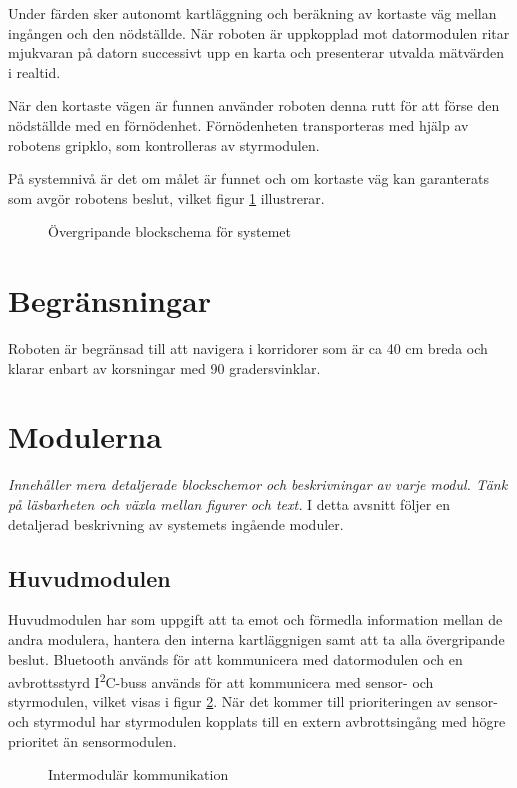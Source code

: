 \documentclass[11pt]{article}
\begin{document}
\begin{flushleft}
Under färden sker autonomt kartläggning och beräkning av kortaste väg mellan ingången och den nödställde. När roboten är uppkopplad mot datormodulen ritar mjukvaran på datorn successivt upp en karta och presenterar utvalda mätvärden i realtid. 

När den kortaste vägen är funnen använder roboten denna rutt för att förse den nödställde med en förnödenhet. Förnödenheten transporteras med hjälp av robotens gripklo, som kontrolleras av styrmodulen.

På systemnivå är det om målet är funnet och om kortaste väg kan garanterats som avgör robotens beslut, vilket figur \ref{blockSystem} illustrerar.

\begin{figure}[htbp]
\centering
\noindent\resizebox{1\linewidth}{!}{
	}
	\caption{Övergripande blockschema för systemet}	\label{blockSystem}
\end{figure}

\section{Begränsningar} 
Roboten är begränsad till att navigera i korridorer som är ca 40 cm breda och klarar enbart av korsningar med 90 gradersvinklar.

\section{Modulerna}
\textit{Innehåller mera detaljerade blockschemor och beskrivningar av varje modul. Tänk på läsbarheten och växla mellan figurer och text.}
I detta avsnitt följer en detaljerad beskrivning av systemets ingående moduler. 

\subsection{Huvudmodulen}
Huvudmodulen har som uppgift att ta emot och förmedla information mellan de andra modulera, hantera den interna kartläggnigen samt att ta alla övergripande beslut. Bluetooth\textsuperscript{\circledR} används för att kommunicera med datormodulen och en avbrottsstyrd I\textsuperscript{2}C-buss används för att kommunicera med sensor- och styrmodulen, vilket visas i figur \ref{communication}. När det kommer till prioriteringen av sensor- och styrmodul har styrmodulen kopplats till en extern avbrottsingång med högre prioritet än sensormodulen.

\begin{figure}[htbp]
\noindent\resizebox{.97\textwidth}{!}{
	}
	\caption{Intermodulär kommunikation \label{communication}}
\end{figure}


\end{flushleft}
\end{document}
